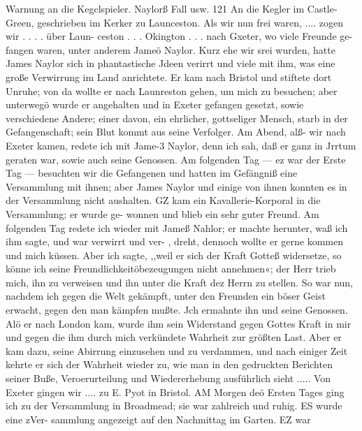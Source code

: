 Warnung an die Kegclspieler. Naylorß Fall usw. 121
An die Kegler im Castle-Green, geschrieben im Kerker zu Launceston.
Als wir nun frei waren, .... zogen wir . . . . über Laun-
ceston . . . Okington . . . nach Gxeter, wo viele Freunde ge-
fangen waren, unter anderem Jameö Naylor. Kurz ehe wir
srei wurden, hatte James Naylor sich in phantastische Jdeen
verirrt und viele mit ihm, was eine große Verwirrung im Land
anrichtete. Er kam nach Bristol und stiftete dort Unruhe; von
da wollte er nach Launreston gehen, um mich zu besuchen; aber
unterwegö wurde er angehalten und in Exeter gefangen gesetzt,
sowie verschiedene Andere; einer davon, ein ehrlicher, gottseliger
Mensch, starb in der Gefangenschaft; sein Blut kommt aus seine
Verfolger.
Am Abend, alß- wir nach Exeter kamen, redete ich mit Jame-3
Naylor, denn ich sah, daß er ganz in Jrrtum geraten war, sowie
auch seine Genossen. Am folgenden Tag — ez war der Erste
Tag — besuchten wir die Gefangenen und hatten im Gefängniß
eine Versammlung mit ihnen; aber James Naylor und einige
von ihnen konnten es in der Versammlung nicht aushalten. GZ
kam ein Kavallerie-Korporal in die Versammlung; er wurde ge-
wonnen und blieb ein sehr guter Freund.
Am folgenden Tag redete ich wieder mit Jameß Nahlor; er
machte herunter, waß ich ihm sagte, und war verwirrt und ver-
, dreht, dennoch wollte er gerne kommen und mich küssen. Aber
ich sagte, ,,weil er sich der Kraft Gotteß widersetze, so könne ich
seine Freundlichkeitöbezeugungen nicht annehmen«; der Herr trieb
mich, ihn zu verweisen und ihn unter die Kraft dez Herrn zu
stellen. So war nun, nachdem ich gegen die Welt gekämpft, unter
den Freunden ein böser Geist erwacht, gegen den man kämpfen
mußte. Jch ermahnte ihn und seine Genossen. Alö er nach
London kam, wurde ihm sein Widerstand gegen Gottes Kraft in
mir und gegen die ihm durch mich verkündete Wahrheit zur
größten Last. Aber er kam dazu, seine Abirrung einzusehen und
zu verdammen, und nach einiger Zeit kehrte er sich der Wahrheit
wieder zu, wie man in den gedruckten Berichten seiner Buße,
Veroerurteilung und Wiedererhebung ausführlich sieht .....
Von Exeter gingen wir .... zu E. Pyot in Bristol. AM
Morgen deö Ersten Tages ging ich zu der Versammlung in
Broadmead; sie war zahlreich und ruhig. ES wurde eine zVer-
sammlung angezeigt auf den Nachmittag im Garten. EZ war


